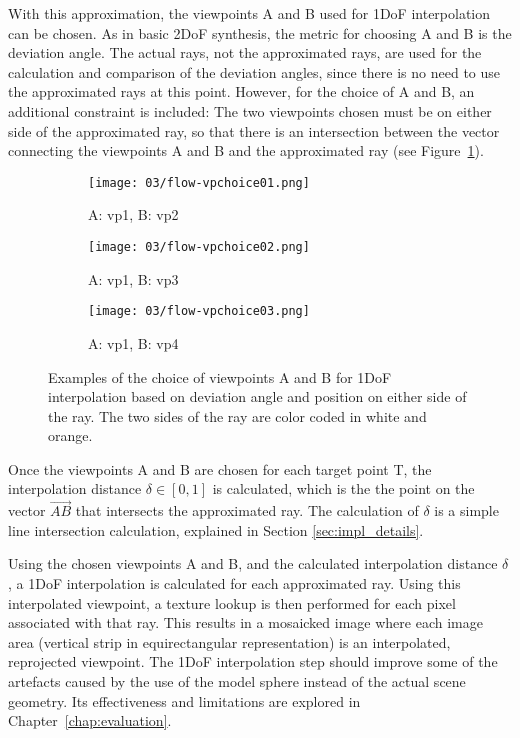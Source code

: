 With this approximation, the viewpoints A and B used for 1DoF interpolation can be chosen. As in basic 2DoF synthesis, the metric for choosing A and B is the deviation angle. The actual rays, not the approximated rays, are used for the calculation and comparison of the deviation angles, since there is no need to use the approximated rays at this point. However, for the choice of A and B, an additional constraint is included: The two viewpoints chosen must be on either side of the approximated ray, so that there is an intersection between the vector connecting the viewpoints A and B and the approximated ray (see Figure~\ref{fig:flow_vpchoice}).

\begin{figure}
\centering
    \hfill
    \begin{subfigure}[t]{0.3\textwidth}
            \centering
            \texttt{[image: 03/flow-vpchoice01.png]}
            \caption{A: vp1, B: vp2}
    \end{subfigure}%
    \hfill
    \begin{subfigure}[t]{0.3\textwidth}
            \centering
            \texttt{[image: 03/flow-vpchoice02.png]}
            \caption{A: vp1, B: vp3}
    \end{subfigure}
    \hfill
    \begin{subfigure}[t]{0.3\textwidth}
            \centering
            \texttt{[image: 03/flow-vpchoice03.png]}
            \caption{A: vp1, B: vp4}
    \end{subfigure}%
    \hfill
    \hfill
  \caption[Examples of the choice of viewpoints A and B for 1DoF interpolation]{Examples of the choice of viewpoints A and B for 1DoF interpolation based on deviation angle and position on either side of the ray. The two sides of the ray are color coded in white and orange.} \label{fig:flow_vpchoice}
\end{figure}

Once the viewpoints A and B are chosen for each target point T, the interpolation distance $\delta \in [0,1]$ is calculated, which is the the point on the vector $\overrightarrow{AB}$ that intersects the approximated ray. The calculation of $\delta$ is a simple line intersection calculation, explained in Section \ref{sec:impl_details}.

Using the chosen viewpoints A and B, and the calculated interpolation distance $\delta$, a 1DoF interpolation is calculated for each approximated ray. Using this interpolated viewpoint, a texture lookup is then performed for each pixel associated with that ray. This results in a mosaicked image where each image area (vertical strip in equirectangular representation) is an interpolated, reprojected viewpoint. The 1DoF interpolation step should improve some of the artefacts caused by the use of the model sphere instead of the actual scene geometry. Its effectiveness and limitations are explored in Chapter~\ref{chap:evaluation}.

